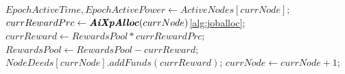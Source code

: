 \documentclass{article}
\begin{document}
\begin{algorithm}
\begin{algorithmic}[1]
            \State $EpochActiveTime, EpochActivePower \gets ActiveNodes[currNode]$;\vspace{1mm}
            \State $currRewardPrc \gets \textbf{\textit{AiXpAlloc}}(currNode)$\ref{alg:joballoc};\vspace{1mm}
            \State $currReward \gets RewardsPool * currRewardPrc$;\vspace{1mm}
            \State $RewardsPool \gets RewardsPool - currReward$;\vspace{1mm}
            \State $NodeDeeds[currNode].addFunds(currReward)$;\vspace{1mm}
            \State $currNode \gets currNode + 1$;\vspace{1mm}
        \EndWhile
    \EndWhile\vspace{1mm}
\end{algorithmic}
\end{algorithm}
\end{document}
